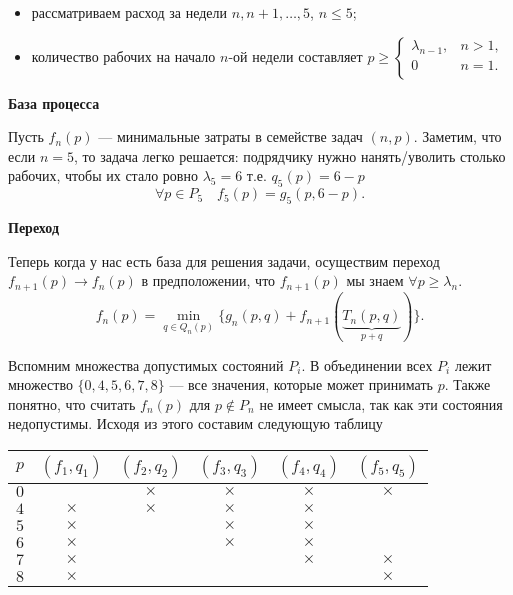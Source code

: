 \begin{itemize}[nosep]
	\item рассматриваем расход за недели $n, n+1, \dots, 5$, $n \le 5$;
	
	\item количество рабочих на начало $n$-ой недели составляет $p \ge \begin{cases}
		\lambda_{n - 1},& n > 1, \\
		 0& n = 1. \\
	\end{cases}$
\end{itemize}

\bigskip

\textbf{База процесса}

Пусть $f_n(p)$ --- минимальные затраты в семействе задач $(n, p)$. Заметим, что если $n = 5$, то задача легко решается: подрядчику нужно нанять/уволить столько рабочих, чтобы их стало ровно $\lambda_5 = 6$ т.е. $q_5(p) = 6 - p$
\[
\forall p \in P_5 \quad f_5(p) = g_5(p, 6 - p).
\]

\bigskip

\textbf{Переход}

Теперь когда у нас есть база для решения задачи, осуществим переход $f_{n+1}(p) \to f_n(p)$ в предположении, что $f_{n+1}(p)$ мы знаем $\forall p \ge \lambda_{n}$.
\[
\boxed{f_n(p) = \min_{q \in Q_n(p)} \Big\{ g_n(p, q) + f_{n + 1}(\underbrace{T_n(p, q)}_{p + q}) \Big\}}.\tag{**}
\]

Вспомним множества допустимых состояний $P_i$. В объединении всех $P_i$ лежит множество $\{0, 4, 5, 6, 7, 8\}$ --- все значения, которые может принимать $p$. Также понятно, что считать $f_n(p)$ для $p \notin P_n$ не имеет смысла, так как эти состояния недопустимы. Исходя из этого составим следующую таблицу

\begin{table}[H]
	\centering
	\begin{tabular}{ | c | c | c | c | c | c | } 
		\hline
		$p$ & $(f_1, q_1)$ & $(f_2, q_2)$ & $(f_3, q_3)$ & $(f_4, q_4)$ & $(f_5, q_5)$ \\ 
		\hline
		$0$ & & $\times$ & $\times$ & $\times$ & $\times$ \\\hline
		$4$ & $\times$ & $\times$ & $\times$ & $\times$ & \\\hline
		$5$ & $\times$ & & $\times$ & $\times$ & \\\hline
		$6$ & $\times$ & & $\times$ & $\times$ & \\\hline
		$7$ & $\times$ & & & $\times$ & $\times$ \\\hline
		$8$ & $\times$ & & & & $\times$ \\\hline
	\end{tabular}
\end{table}


